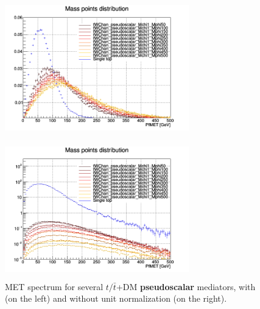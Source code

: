 \documentclass[a4paper, 10pt, openright]{report}
\begin{document}
\begin{figure}[htbp]
\centering
\begin{minipage}[b]{.49\textwidth}
\includegraphics[width=8cm, height=6cm]{figs/singleTopPseudoMETNorm.png}
\end{minipage}\hfill
\begin{minipage}[b]{.49\textwidth}
\includegraphics[width=8cm, height=6cm]{figs/singleTopPseudoMET.png}
\end{minipage} \hfill
\caption{\ac{MET} spectrum for several $t/\bar t$+DM \textbf{pseudoscalar} mediators, with (on the left) and without unit normalization (on the right).}
\label{fig:signalSinglePseudo}
\end{figure}
\end{document}
